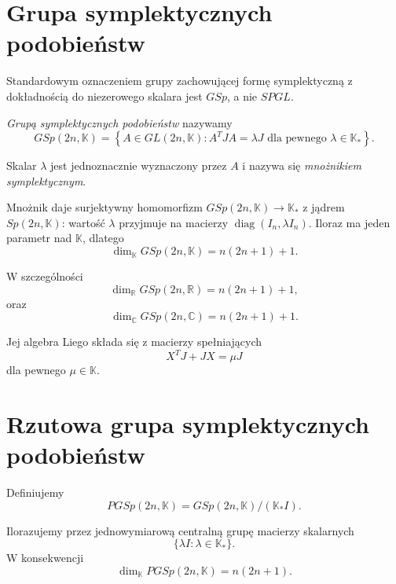 \section{Grupa symplektycznych podobieństw}


Standardowym oznaczeniem grupy zachowującej formę symplektyczną
z dokładnością do niezerowego skalara jest $GSp$, a nie $SPGL$.

\begin{definicja}
\emph{Grupą symplektycznych podobieństw} nazywamy
\[
GSp(2n,\mathbb K)
=
\left\{
A\in GL(2n,\mathbb K):
A^TJA=\lambda J
\text{ dla pewnego }
\lambda\in\mathbb K_*
\right\}.
\]
\end{definicja}

Skalar $\lambda$ jest jednoznacznie wyznaczony przez $A$ i nazywa
się \emph{mnożnikiem symplektycznym}.

Mnożnik daje surjektywny homomorfizm
$GSp(2n,\mathbb K)\to\mathbb K_*$ z jądrem
$Sp(2n,\mathbb K)$: wartość $\lambda$ przyjmuje
na macierzy $\operatorname{diag}(I_n,\lambda I_n)$.
Iloraz ma jeden parametr nad $\mathbb K$, dlatego
\[
\boxed{
\dim_{\mathbb K}GSp(2n,\mathbb K)
=
n(2n+1)+1.
}
\]

W szczególności
\[
\dim_{\mathbb R}GSp(2n,\mathbb R)
=
n(2n+1)+1,
\]
oraz
\[
\dim_{\mathbb C}GSp(2n,\mathbb C)
=
n(2n+1)+1.
\]

Jej algebra Liego składa się z macierzy spełniających
\[
X^TJ+JX=\mu J
\]
dla pewnego $\mu\in\mathbb K$.



\section{Rzutowa grupa symplektycznych podobieństw}


Definiujemy
\[
PGSp(2n,\mathbb K)
=
GSp(2n,\mathbb K)/(\mathbb K_* I).
\]

Ilorazujemy przez jednowymiarową centralną grupę macierzy skalarnych
\[
\{\lambda I:\lambda\in\mathbb K_*\}.
\]
W konsekwencji
\[
\boxed{
\dim_{\mathbb K}PGSp(2n,\mathbb K)
=
n(2n+1).
}
\]



